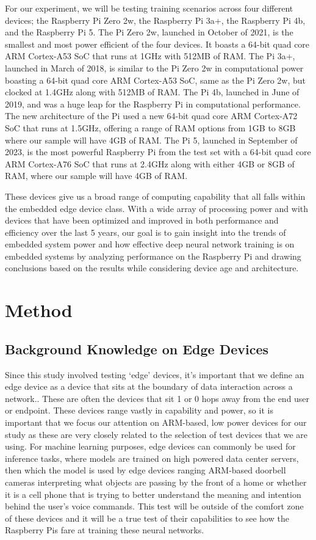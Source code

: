 \documentclass{article}
\begin{document}
\begin{multicols}{2}
For our experiment, we will be testing training scenarios across four different devices; the Raspberry Pi Zero 2w, the Raspberry Pi 3a+, the Raspberry Pi 4b, and the Raspberry Pi 5. The Pi Zero 2w, launched in October of 2021, is the smallest and most power efficient of the four devices. It boasts a 64-bit quad core ARM Cortex-A53 SoC that runs at 1GHz with 512MB of RAM\cite{website:rpi_zero}. The Pi 3a+, launched in March of 2018, is similar to the Pi Zero 2w in computational power boasting a 64-bit quad core ARM Cortex-A53 SoC, same as the Pi Zero 2w, but clocked at 1.4GHz along with 512MB of RAM\cite{website:rpi_3}. The Pi 4b, launched in June of 2019, and was a huge leap for the Raspberry Pi in computational performance. The new architecture of the Pi used a new 64-bit quad core ARM Cortex-A72 SoC that runs at 1.5GHz, offering a range of RAM options from 1GB to 8GB where our sample will have 4GB of RAM\cite{website:rpi_4}. The Pi 5, launched in September of 2023, is the most powerful Raspberry Pi from the test set with a 64-bit quad core ARM Cortex-A76 SoC that runs at 2.4GHz along with either 4GB or 8GB of RAM, where our sample will have 4GB of RAM\cite{website:rpi_5}.

These devices give us a broad range of computing capability that all falls within the embedded edge device class. With a wide array of processing power and with devices that have been optimized and improved in both performance and efficiency over the last 5 years, our goal is to gain insight into the trends of embedded system power and how effective deep neural network training is on embedded systems by analyzing performance on the Raspberry Pi and drawing conclusions based on the results while considering device age and architecture.


\section{Method}
\subsection{Background Knowledge on Edge Devices}
Since this study involved testing ‘edge’ devices, it’s important that we define an edge device as a device that sits at the boundary of data interaction across a network\cite{website:edge_device}.. These are often the devices that sit 1 or 0 hops away from the end user or endpoint. These devices range vastly in capability and power, so it is important that we focus our attention on ARM-based, low power devices for our study as these are very closely related to the selection of test devices that we are using. For machine learning purposes, edge devices can commonly be used for inference tasks, where models are trained on high powered data center servers, then which the model is used by edge devices ranging ARM-based doorbell cameras interpreting what objects are passing by the front of a home or whether it is a cell phone that is trying to better understand the meaning and intention behind the user’s voice commands. This test will be outside of the comfort zone of these devices and it will be a true test of their capabilities to see how the Raspberry Pis fare at training these neural networks.


\end{multicols}
\end{document}
